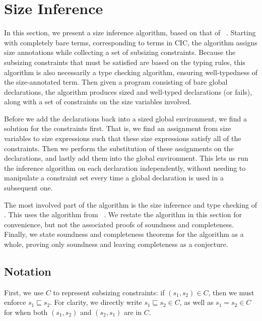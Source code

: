 \section{Size Inference}\label{sec:algorithm}

In this section, we present a size inference algorithm, based on that of \CIChat~\citep{cic-hat}.
Starting with completely bare terms, corresponding to terms in CIC,
the algorithm assigns size annotations while collecting a set of subsizing constraints.
Because the subsizing constraints that must be satisfied are based on the typing rules,
this algorithm is also necessarily a type checking algorithm,
ensuring well-typedness of the size-annotated term.
Then given a program consisting of bare global declarations,
the algorithm produces sized and well-typed declarations (or fails),
along with a set of constraints on the size variables involved.

Before we add the declarations back into a sized global environment,
we find a solution for the constraints first.
That is, we find an assignment from size variables to size expressions
such that these size expressions satisfy all of the constraints.
Then we perform the substitution of these assignments on the declarations,
and lastly add them into the global environment.
This lets us run the inference algorithm on each declaration independently,
without needing to manipulate a constraint set every time a global declaration is used in a subsequent one.

The most involved part of the algorithm is the size inference and type checking of \cofixpoints.
This uses the \RecCheck algorithm from \Fhat~\citep{f-hat}.
We restate the algorithm in this section for convenience, but not the associated proofs of soundness and completeness.
Finally, we state soundness and completeness theorems for the algorithm as a whole,
proving only soundness and leaving completeness as a conjecture.

\subsection{Notation}



First, we use $C$ to represent subsizing constraints: if $(s_1, s_2) \in C$, then we must enforce $s_1 \sqsubseteq s_2$.
For clarity, we directly write $s_1 \sqsubseteq s_2 \in C$, as well as $s_1 = s_2 \in C$ for when both $(s_1, s_2)$ and $(s_2, s_1)$ are in $C$.

